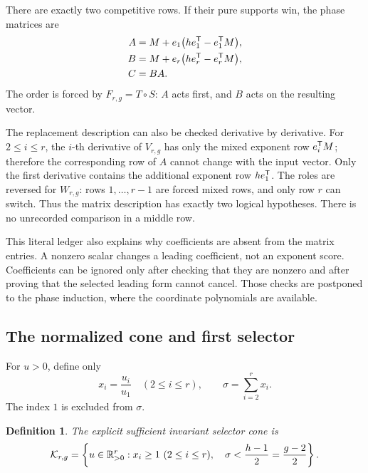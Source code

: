 \documentclass[11pt]{article}
\newtheorem{definition}[theorem]{Definition}
\theoremstyle{remark}
\numberwithin{equation}{section}
\begin{document}
There are exactly two competitive rows.  If their pure supports win, the
phase matrices are
\begin{equation}\label{eq:A-B-def}
\begin{aligned}
A&=M+e_1\bigl(he_1^{\mathsf{T}}-e_1^{\mathsf{T}}M\bigr),\\
B&=M+e_r\bigl(he_r^{\mathsf{T}}-e_r^{\mathsf{T}}M\bigr),\\
C&=BA.
\end{aligned}
\end{equation}
The order is forced by \(F_{r,g}=T\circ S\): \(A\) acts first, and \(B\)
acts on the resulting vector.

The replacement description can also be checked derivative by derivative.
For \(2\leq i\leq r\), the \(i\)-th derivative of \(V_{r,g}\) has only
the mixed exponent row \(e_i^{\mathsf{T}}M\); therefore the corresponding
row of \(A\) cannot change with the input vector.  Only the first derivative
contains the additional exponent row \(he_1^{\mathsf{T}}\).  The roles are
reversed for \(W_{r,g}\): rows \(1,\ldots,r-1\) are forced mixed rows, and
only row \(r\) can switch.  Thus the matrix description has exactly two
logical hypotheses.  There is no unrecorded comparison in a middle row.

This literal ledger also explains why coefficients are absent from the
matrix entries.  A nonzero scalar changes a leading coefficient, not an
exponent score.  Coefficients can be ignored only after checking that they
are nonzero and after proving that the selected leading form cannot cancel.
Those checks are postponed to the phase induction, where the coordinate
polynomials are available.

\subsection{The normalized cone and first selector}

For \(u>0\), define only
\begin{equation}\label{eq:ratios}
x_i=\frac{u_i}{u_1}\quad(2\leq i\leq r),
\qquad
\sigma=\sum_{i=2}^{r}x_i.
\end{equation}
The index \(1\) is excluded from \(\sigma\).

\begin{definition}\label{def:selector-cone}
The \emph{explicit sufficient invariant selector cone} is
\begin{equation}\label{eq:cone}
\mathcal{K}_{r,g}=
\left\{u\in\mathbb{R}_{>0}^r:
x_i\geq1\ (2\leq i\leq r),\quad
\sigma<\frac{h-1}{2}=\frac{g-2}{2}\right\}.
\end{equation}
\end{definition}
\end{document}

